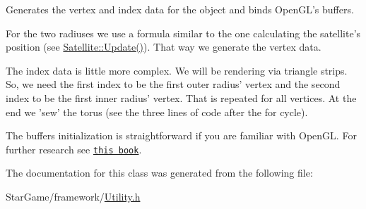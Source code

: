 Generates the vertex and index data for the object and binds Open\-G\-L's buffers. 

For the two radiuses we use a formula similar to the one calculating the satellite's position (see \hyperlink{class_satellite_a9922529e27792578c7047bb91d27e21f}{Satellite\-::\-Update()}). That way we generate the vertex data.

The index data is little more complex. We will be rendering via triangle strips. So, we need the first index to be the first outer radius' vertex and the second index to be the first inner radius' vertex. That is repeated for all vertices. At the end we 'sew' the torus (see the three lines of code after the {\ttfamily for} cycle).

The buffers initialization is straightforward if you are familiar with Open\-G\-L. For further research see \href{http://www.arcsynthesis.org/gltut/}{\tt this book}. 

The documentation for this class was generated from the following file\-:\begin{DoxyCompactItemize}
\item 
Star\-Game/framework/\hyperlink{_utility_8h}{Utility.\-h}\end{DoxyCompactItemize}
